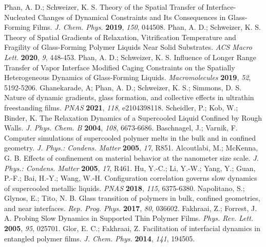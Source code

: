 \documentclass[twocolumn,preprintnumbers,amsmath,amssymb,superscriptaddress]{revtex4}
\begin{document}
\begin{thebibliography}{5}
 Phan, A. D.; Schweizer, K. S. Theory of the Spatial Transfer of Interface-Nucleated Changes of Dynamical Constraints and Its Consequences in Glass-Forming Films. \emph{J. Chem. Phys.} {\bf2019}, \emph{150}, 044508.
 Phan, A. D.; Schweizer, K. S. Theory of Spatial Gradients of Relaxation, Vitrification Temperature and Fragility of Glass-Forming Polymer Liquids Near Solid Substrates. \emph{ACS Macro Lett.} {\bf2020}, \emph{9}, 448-453.
 Phan, A. D.; Schweizer, K. S. Influence of Longer Range Transfer of Vapor Interface Modified Caging Constraints on the Spatially Heterogeneous Dynamics of Glass-Forming Liquids. \emph{Macromolecules} {\bf2019}, \emph{52}, 5192-5206.
 Ghanekarade, A; Phan, A. D.; Schweizer, K. S.; Simmons, D. S. Nature of dynamic gradients, glass formation, and collective effects in ultrathin freestanding films. \emph{PNAS} {\bf2021}, \emph{118}, e2104398118. 
 Scheidler, P.; Kob, W.; Binder, K. The Relaxation Dynamics of a Supercooled Liquid Confined by Rough Walls. \emph{J. Phys. Chem. B} {\bf2004}, \emph{108}, 6673-6686.
 Baschnagel, J.; Varnik, F. Computer simulations of supercooled polymer melts in the bulk and in confined geometry. \emph{J. Phys.: Condens. Matter} {\bf2005}, \emph{17}, R851.
 Alcoutlabi, M.; McKenna, G. B. Effects of confinement on material behavior at the nanometer size scale. \emph{J. Phys.: Condens. Matter} {\bf2005}, \emph{17}, R461.
 Hu, Y.-C.; Li, Y.-W.; Yang, Y.; Guan, P.-F.; Bai, H.-Y.; Wang, W.-H. Configuration correlation governs slow dynamics of supercooled metallic liquids. \emph{PNAS} {\bf2018}, \emph{115}, 6375-6380.
 Napolitano, S.; Glynos, E.; Tito, N. B. Glass transition of polymers in bulk, confined geometries, and near interfaces. \emph{Rep. Prog. Phys.} {\bf2017}, \emph{80}, 036602.
 Fakhraai, Z.; Forrest, J. A. Probing Slow Dynamics in Supported Thin Polymer Films. \emph{Phys. Rev. Lett.} {\bf2005}, \emph{95}, 025701.
 Glor, E. C.; Fakhraai, Z. Facilitation of interfacial dynamics in entangled polymer films. \emph{J. Chem. Phys.} {\bf2014}, \emph{141}, 194505.


\end{thebibliography}
\end{document}
